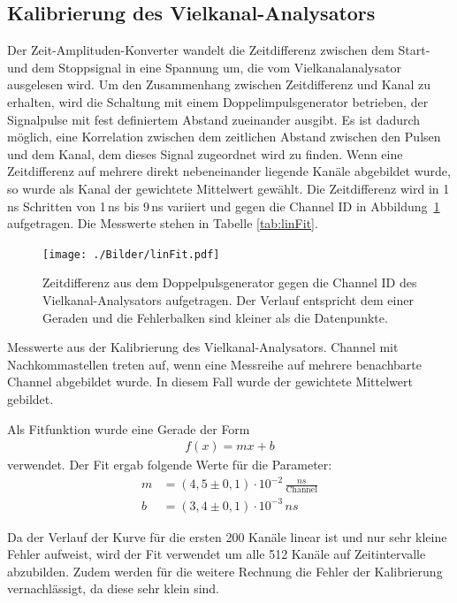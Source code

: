 \subsection{Kalibrierung des Vielkanal-Analysators}
Der Zeit-Amplituden-Konverter wandelt die Zeitdifferenz zwischen dem Start- und dem Stoppsignal in eine Spannung um, die vom Vielkanalanalysator ausgelesen wird. Um den Zusammenhang zwischen Zeitdifferenz und Kanal zu erhalten, wird die Schaltung mit einem Doppelimpulsgenerator betrieben, der Signalpulse mit fest definiertem Abstand zueinander ausgibt. Es ist dadurch möglich, eine Korrelation zwischen dem zeitlichen Abstand zwischen den Pulsen und dem Kanal, dem dieses Signal zugeordnet wird zu finden. Wenn eine Zeitdifferenz auf mehrere direkt nebeneinander liegende Kanäle abgebildet wurde, so wurde als Kanal der gewichtete Mittelwert gewählt. Die Zeitdifferenz wird in 1\,\si{ns} Schritten von 1\,ns bis 9\,ns variiert und gegen die Channel ID in \mbox{Abbildung \ref{fig:linFit}} aufgetragen. Die Messwerte stehen in Tabelle \ref{tab:linFit}.

\begin{figure}[H]
	\texttt{[image: ./Bilder/linFit.pdf]}
	\caption{Zeitdifferenz aus dem Doppelpulsgenerator gegen die Channel ID des Vielkanal-Analysators aufgetragen. Der Verlauf entspricht dem einer Geraden und die Fehlerbalken sind kleiner als die Datenpunkte.}
	\label{fig:linFit}
\end{figure}

\begin{table}[htbp]
	
	\caption{Messwerte aus der Kalibrierung des Vielkanal-Analysators. Channel mit Nachkommastellen treten auf, wenn eine Messreihe auf mehrere benachbarte Channel abgebildet wurde. In diesem Fall wurde der gewichtete Mittelwert gebildet.}
	\label{tab:linFit}
\end{table}

Als Fitfunktion wurde eine Gerade der Form
\begin{align}
	f(x) = mx + b
	\label{eq:vielkanal}
\end{align}
verwendet. Der Fit ergab folgende Werte für die Parameter:
\begin{align}
	m &= (4,5 \pm 0,1) \cdot10^{-2} \,\frac{\si{ns}}{\text{Channel}}\\ 
	b &= (3,4 \pm 0,1) \cdot 10^{-3}\, \si{ns}
\end{align}

Da der Verlauf der Kurve für die ersten 200 Kanäle linear ist und nur sehr kleine Fehler aufweist, wird der Fit verwendet um alle 512 Kanäle auf Zeitintervalle abzubilden. Zudem werden für die weitere Rechnung die Fehler der Kalibrierung vernachlässigt, da diese sehr klein sind.

